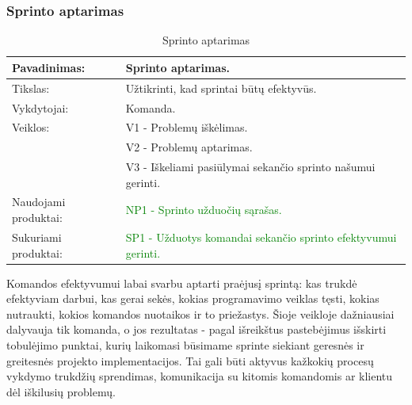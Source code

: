 \documentclass{VUMIFPSkursinis}
\begin{document}
	\subsubsection{Sprinto aptarimas}
	\begin{center}
		\begin{table}[ht]
			\caption{Sprinto aptarimas}
			\begin{tabular}{ | l | l | }
				\hline
				Pavadinimas:		& Sprinto aptarimas.							\\ \hline
				Tikslas:		& Užtikrinti, kad sprintai būtų efektyvūs.				\\ \hline
				Vykdytojai:		& Komanda.								\\ \hline
				Veiklos:		& V1 - Problemų iškėlimas.						\\
							& V2 - Problemų aptarimas.						\\
							& V3 - Iškeliami pasiūlymai sekančio sprinto našumui gerinti.		\\ \hline

				Naudojami produktai:	& \textcolor{green}{NP1 - Sprinto užduočių sąrašas. 	}				\\ \hline
				Sukuriami produktai:	& \textcolor{green}{SP1 - Užduotys komandai sekančio sprinto efektyvumui gerinti.}	\\ \hline
			\end{tabular}
		\end{table}
	\end{center}
	Komandos efektyvumui labai svarbu aptarti praėjusį sprintą: kas trukdė efektyviam darbui, kas gerai sekės, kokias programavimo veiklas tęsti, kokias nutraukti, kokios komandos nuotaikos ir to priežastys.
	Šioje veikloje dažniausiai dalyvauja tik komanda, o jos rezultatas - pagal išreikštus pastebėjimus išskirti tobulėjimo punktai, kurių laikomasi būsimame sprinte siekiant geresnės ir greitesnės projekto implementacijos.
	Tai gali būti aktyvus kažkokių procesų vykdymo trukdžių sprendimas, komunikacija su kitomis komandomis ar klientu dėl iškilusių problemų.

	\newpage
\end{document}
